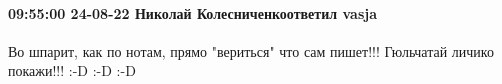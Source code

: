  
 
 
 
 

\paragraph{09:55:00 24-08-22 Николай Колесниченкоответил vasja}

Во шпарит, как по нотам, прямо "вериться" что сам пишет!!! Гюльчатай личико
покажи!!! :-D :-D :-D
